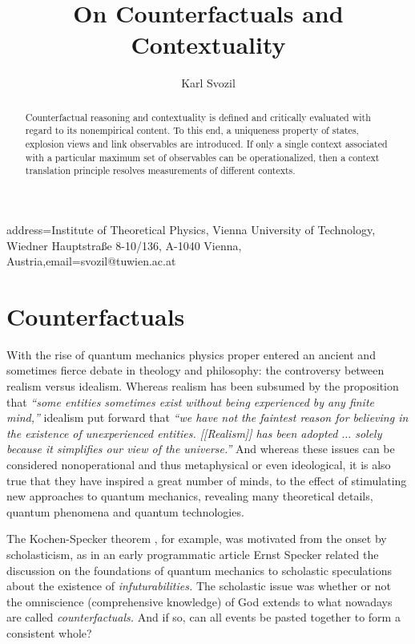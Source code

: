 \documentclass{aipproc}
\begin{document}
\title{On Counterfactuals and Contextuality}

\author{Karl Svozil}{address={Institute of Theoretical Physics, Vienna
    University of Technology, Wiedner Hauptstra\ss e 8-10/136, A-1040
    Vienna, Austria},email={svozil@tuwien.ac.at}}


\begin{abstract}
Counterfactual reasoning and contextuality is defined and critically evaluated
with regard to its nonempirical content.
To this end, a uniqueness property of states, explosion views and link observables are introduced.
If only a single context associated with a particular maximum set of observables can be operationalized,
then a context translation principle resolves measurements of different contexts.
\end{abstract}
\maketitle


\section{Counterfactuals}

With the rise of quantum mechanics
\cite{schrodinger,reich-44,jammer:66,jammer1}
physics proper entered
an ancient and sometimes fierce debate in theology and philosophy:
the controversy between realism versus idealism.
Whereas realism has been subsumed by the proposition that \cite{stace}
{\em ``some entities sometimes exist without being experienced by any finite mind,''}
idealism put forward that
{\em ``we have not the faintest reason for believing in the existence of
unexperienced entities. [[Realism]] has been adopted
$\ldots$
solely because it simplifies our view of the universe.''}
And whereas these issues can be considered nonoperational and thus metaphysical or even ideological,
it is also true that they have inspired a great number of minds,
to the effect of stimulating new approaches to quantum mechanics,
revealing many theoretical details, quantum phenomena and quantum technologies.


The Kochen-Specker theorem \cite{kochen1}, for example, was motivated from the onset by scholasticism,
as in an early programmatic article \cite{specker-60}
Ernst Specker related the discussion on the foundations of quantum mechanics
to scholastic speculations  about the existence of {\em infuturabilities.}
The scholastic issue was whether or not the omniscience (comprehensive knowledge) of God extends to
what nowadays are called {\em counterfactuals.}
And if so, can all events be pasted together to form a consistent whole?
\end{document}
